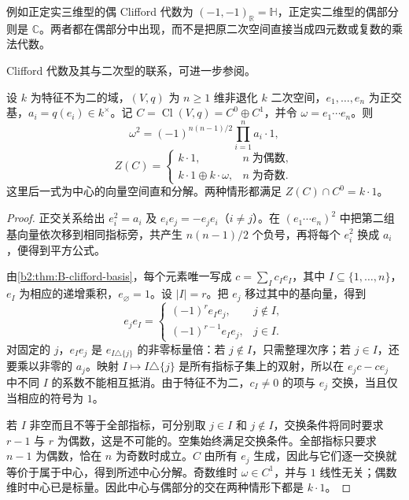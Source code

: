 例如正定实三维型的偶 Clifford 代数为 \((-1,-1)_{\mathbb R}=\mathbb H\)，正定实二维型的偶部分则是 \(\mathbb C\)。两者都在偶部分中出现，而不是把原二次空间直接当成四元数或复数的乘法代数。

\ProseParagraphBreak
Clifford 代数及其与二次型的联系，可进一步参阅\cite[Chapter ``Clifford algebras'']{Lam2005QuadraticForms}。

\begin{proposition}\label{b2:prop:B-clifford-center}
	设 \(k\) 为特征不为二的域，\((V,q)\) 为 \(n\ge1\) 维非退化 \(k\) 二次空间，\(e_1,\ldots,e_n\) 为正交基，\(a_i=q(e_i)\in k^\times\)。记 \(C=\operatorname{Cl}(V,q)=C^0\oplus C^1\)，并令 \(\omega=e_1\cdots e_n\)。则
	\[
		\omega^2=(-1)^{n(n-1)/2}\prod_{i=1}^n a_i\cdot1,
	\]
	\[
		Z(C)=
		\begin{cases}
			k\cdot1,&n\;\text{为偶数},\\
			k\cdot1\oplus k\cdot\omega,&n\;\text{为奇数}.
		\end{cases}
	\]
	这里后一式为中心的向量空间直和分解。两种情形都满足 \(Z(C)\cap C^0=k\cdot1\)。
\end{proposition}
\begin{proof}
	正交关系给出 \(e_i^2=a_i\) 及 \(e_ie_j=-e_je_i\)（\(i\ne j\)）。在 \((e_1\cdots e_n)^2\) 中把第二组基向量依次移到相同指标旁，共产生 \(n(n-1)/2\) 个负号，再将每个 \(e_i^2\) 换成 \(a_i\)，便得到平方公式。

	由\cref{b2:thm:B-clifford-basis}，每个元素唯一写成 \(c=\sum_I c_Ie_I\)，其中 \(I\subseteq\{1,\ldots,n\}\)，\(e_I\) 为相应的递增乘积，\(e_\varnothing=1\)。设 \(|I|=r\)。把 \(e_j\) 移过其中的基向量，得到
	\[
		e_je_I=
		\begin{cases}
			(-1)^r e_Ie_j,&j\notin I,\\
			(-1)^{r-1}e_Ie_j,&j\in I.
		\end{cases}
	\]
	对固定的 \(j\)，\(e_Ie_j\) 是 \(e_{I\triangle\{j\}}\) 的非零标量倍：若 \(j\notin I\)，只需整理次序；若 \(j\in I\)，还要乘以非零的 \(a_j\)。映射 \(I\mapsto I\triangle\{j\}\) 是所有指标子集上的双射，所以在 \(e_jc-ce_j\) 中不同 \(I\) 的系数不能相互抵消。由于特征不为二，\(c_I\ne0\) 的项与 \(e_j\) 交换，当且仅当相应的符号为 \(1\)。

	若 \(I\) 非空而且不等于全部指标，可分别取 \(j\in I\) 和 \(j\notin I\)，交换条件将同时要求 \(r-1\) 与 \(r\) 为偶数，这是不可能的。空集始终满足交换条件。全部指标只要求 \(n-1\) 为偶数，恰在 \(n\) 为奇数时成立。\(C\) 由所有 \(e_j\) 生成，因此与它们逐一交换就等价于属于中心，得到所述中心分解。奇数维时 \(\omega\in C^1\)，并与 \(1\) 线性无关；偶数维时中心已是标量。因此中心与偶部分的交在两种情形下都是 \(k\cdot1\)。
\end{proof}
